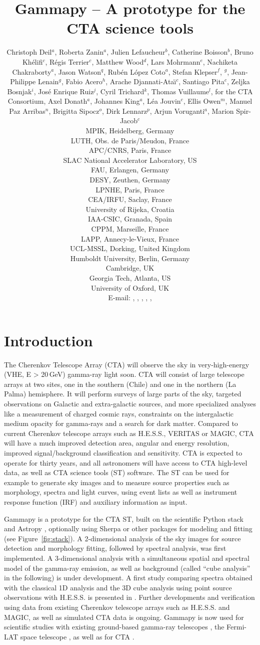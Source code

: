 \documentclass{PoS}
\title{Gammapy -- A prototype for the CTA science tools}
\author{
Christoph Deil$^a$,
Roberta Zanin$^a$,
Julien Lefaucheur$^b$,
Catherine Boisson$^b$,
Bruno Kh\'elifi$^c$,
R\'egis Terrier$^c$,
Matthew Wood$^d$,
Lars Mohrmann$^e$,
Nachiketa Chakraborty$^a$,
Jason Watson$^q$,
Rub\'en L\'opez Coto$^a$,
Stefan Klepser$^f$,
\speaker{Matteo Cerruti}$^g$,
Jean-Philippe Lenain$^g$,
Fabio Acero$^h$,
Arache Djannati-Ata{\"\i}$^c$,
Santiago Pita$^c$,
Zeljka Bosnjak$^i$,
Jos\'e Enrique Ruiz$^j$,
Cyril Trichard$^k$,
Thomas Vuillaume$^l$,
for the CTA Consortium,
Axel Donath$^a$,
Johannes King$^a$,
L\'ea Jouvin$^c$,
Ellis Owen$^m$,
Manuel Paz Arribas$^n$,
Brigitta Sipocz$^o$,
Dirk Lennarz$^p$,
Arjun Voruganti$^a$,
Marion Spir-Jacob$^c$
\\
\llap{$^a$}MPIK, Heidelberg, Germany\\
\llap{$^b$}LUTH, Obs. de Paris/Meudon, France\\
\llap{$^c$}APC/CNRS, Paris, France\\
\llap{$^d$}SLAC National Accelerator Laboratory, US\\
\llap{$^e$}FAU, Erlangen, Germany\\
\llap{$^f$}DESY, Zeuthen, Germany\\
\llap{$^g$}LPNHE, Paris, France\\
\llap{$^h$}CEA/IRFU, Saclay, France\\
\llap{$^i$}University of Rijeka, Croatia\\
\llap{$^j$}IAA-CSIC, Granada, Spain\\
\llap{$^k$}CPPM, Marseille, France\\
\llap{$^l$}LAPP, Annecy-le-Vieux, France\\
\llap{$^m$}UCL-MSSL, Dorking, United Kingdom\\
\llap{$^n$}Humboldt University, Berlin, Germany\\
\llap{$^o$}Cambridge, UK\\
\llap{$^p$}Georgia Tech, Atlanta, US\\
\llap{$^q$}University of Oxford, UK\\
E-mail:
\email{Christoph.Deil@mpi-hd.mpg.de},
\email{Roberta.Zanin@mpi-hd.mpg.de},
\email{julien.lefaucheur@obspm.fr},
\email{catherine.boisson@obspm.fr},
\email{khelifi@apc.in2p3.fr},
}
\begin{document}
\section{Introduction}
\label{sec:intro}

The Cherenkov Telescope Array (CTA) will observe the sky in very-high-energy
(VHE, E > 20$\,$GeV) gamma-ray light soon. CTA will consist of large telescope
arrays at two sites, one in the southern (Chile) and one in the northern (La
Palma) hemisphere. It will perform surveys of large parts of the sky, targeted
observations on Galactic and extra-galactic sources, and more specialized
analyses like a measurement of charged cosmic rays, constraints on the
intergalactic medium opacity for gamma-rays and a search for dark matter.
Compared to current Cherenkov telescope arrays such as H.E.S.S., VERITAS or
MAGIC, CTA will have a much improved detection area, angular and energy
resolution, improved signal/background classification and sensitivity. CTA is
expected to operate for thirty years, and all astronomers will have access to
CTA high-level data, as well as CTA science tools (ST) software. The ST can be
used for example to generate sky images and to measure source properties such as
morphology, spectra and light curves, using event lists as well as instrument
response function (IRF) and auxiliary information as input. 

Gammapy is a prototype for the CTA ST, built on the scientific Python stack and
Astropy \cite{astropy}, optionally using Sherpa \cite{sherpa2001, sherpa2009,
sherpa2011} or other packages for modeling and fitting (see
Figure~\ref{fig:stack}). A 2\hbox{-}dimensional analysis of the sky images 
for source detection and morphology fitting, followed by spectral analysis, was first 
implemented. A 3\hbox{-}dimensional analysis with a simultaneous spatial and spectral model of
the gamma-ray emission, as well as background (called ``cube analysis'' in the
following) is under development.
A first study comparing spectra obtained with the classical 1D analysis and the
3D cube analysis using point source observations with H.E.S.S. is presented in \cite{lea}. Further
developments and verification using data from existing Cherenkov telescope
arrays such as H.E.S.S. and MAGIC, as well as simulated CTA data is ongoing.
Gammapy is now used for scientific studies with existing ground-based
gamma-ray telescopes \cite{hgps, shells}, the Fermi-LAT space telescope
\cite{owen2015}, as well as for CTA \cite{julien, roberta, cyril}.
\end{document}
